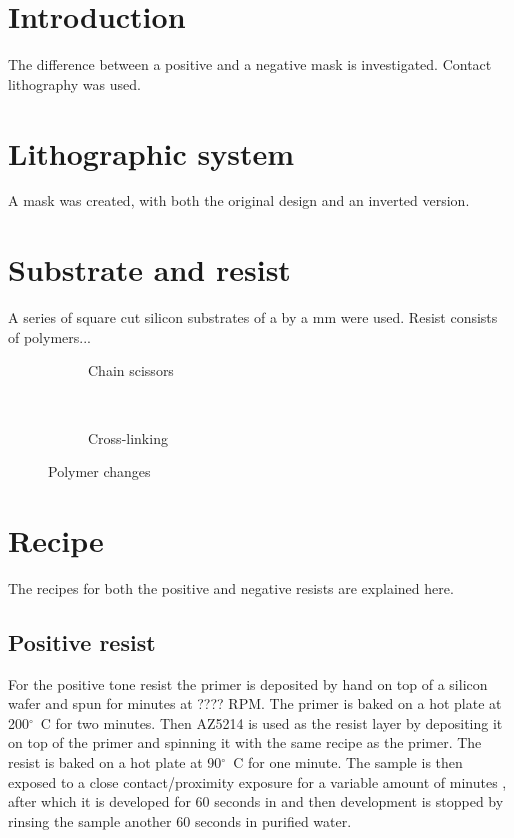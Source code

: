 \section*{Introduction}
The difference between a positive and a negative mask is investigated. Contact lithography was used.

\section*{Lithographic system}
A mask was created, with both the original design and an inverted version.

\section*{Substrate and resist}
A series of square cut silicon substrates of a by a mm  were used. Resist consists of polymers...

\begin{figure}[H]
	\centering
	\begin{subfigure}[t]{0.45\linewidth}
		\centering
		\resizebox{\linewidth}{!}{}
		\caption{Chain scissors}
		\label{fig:chainscissor}
	\end{subfigure}
	~
	\begin{subfigure}[t]{0.45\linewidth}
		\centering
		\resizebox{\linewidth}{!}{}
		\caption{Cross-linking}
		\label{fig:crosslinking}
	\end{subfigure}
	\caption{Polymer changes}
	\label{fig:momentumvectoren}
\end{figure}


\section*{Recipe}
The recipes for both the positive and negative resists are explained here.
\subsection*{Positive resist}
For the positive tone resist the primer  is deposited by hand on top of a silicon wafer and spun for  minutes at ???? RPM. The primer is baked on a hot plate at 200$^{\circ}$~C for two minutes. Then AZ5214  is used as the resist layer by depositing it on top of the primer and spinning it with the same recipe as the primer. The resist is baked on a hot plate at 90$^{\circ}$~C for one minute. The sample is then exposed to a close contact/proximity  exposure for a variable amount of minutes , after which it is developed for 60 seconds in  and then development is stopped by rinsing the sample another 60 seconds in purified water.

